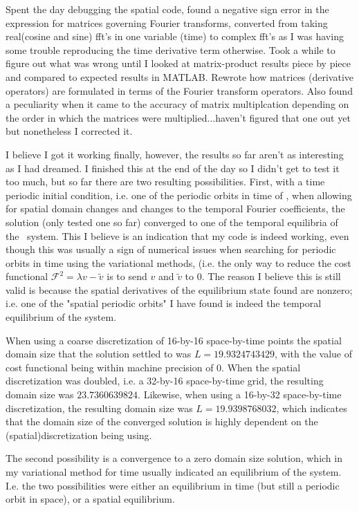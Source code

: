 Spent the day debugging the spatial {\descent} code, found a negative sign error in the expression for
matrices governing Fourier transforms, converted from taking real(cosine and sine) fft's in one variable (time) to complex fft's
as I was having some trouble reproducing the time derivative term otherwise. Took a while to figure out what was wrong until
I looked at matrix-product results piece by piece and compared to expected results in MATLAB. Rewrote how matrices (derivative
operators) are formulated in terms of the Fourier transform operators. Also found a peculiarity when it came to the accuracy
of matrix multiplcation depending on the order in which the matrices were multiplied...haven't figured that one out yet but nonetheless
I corrected it.

I believe I got it working finally, however, the results so far aren't as
interesting as I had dreamed. I finished this at the end of the day so I didn't
get to test it too much, but so far there are two resulting possibilities.
First, with a time periodic initial condition, i.e. one of the periodic orbits
in time of \KS, when allowing for spatial domain changes and changes to the
temporal Fourier coefficients, the solution (only tested one so far) converged
to one of the temporal equilibria of the \KS\ system. This I believe is an
indication that my code is indeed working, even though this was usually a sign
of numerical issues when searching for periodic orbits in time using the
variational methods, (i.e. the only way to reduce the cost functional
$\mathcal{F}^2 = \lambda v - \tilde{v}$ is to send $v$ and $\tilde{v}$ to $0$.
The reason I believe this is still valid is because the spatial derivatives of
the equilibrium state found are nonzero; i.e. one of the "spatial periodic
orbits" I have found is indeed the temporal equilibrium of the system.

When using a coarse discretization of 16-by-16 space-by-time points
the spatial domain size that the solution settled to was $L=19.9324743429$, with the
value of cost functional being within machine precision of $0$.
When the spatial discretization was doubled, i.e. a 32-by-16 space-by-time
grid, the resulting domain size was $23.7360639824$.
Likewise, when using a 16-by-32 space-by-time discretization, the resulting domain size was $L=19.9398768032$, which indicates that the
domain size of the converged solution is highly dependent on the (spatial)discretization being using.

The second possibility is a convergence to a zero domain size solution, which in my variational method for time usually indicated an equilibrium of
the system. I.e. the two possibilities were either an equilibrium in time (but still a periodic orbit in space), or a spatial equilibrium.

